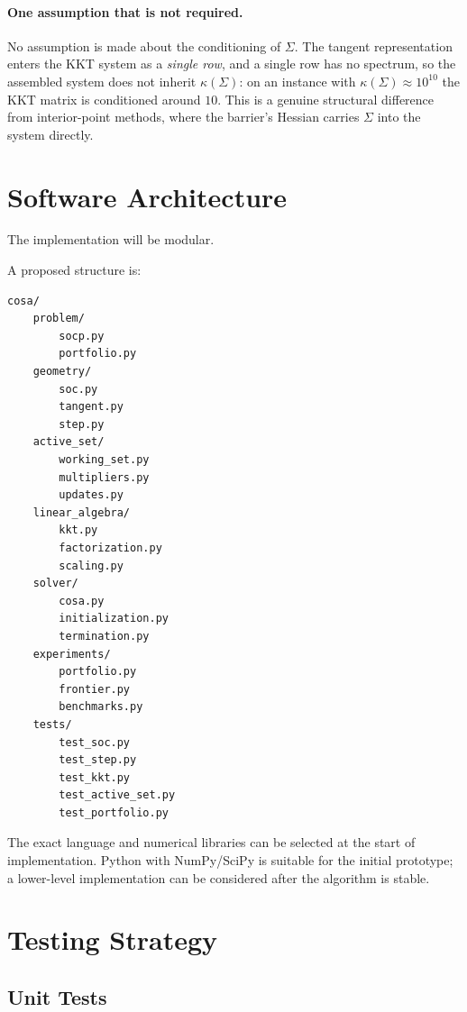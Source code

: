 \documentclass[11pt,a4paper]{article}
\begin{document}
\paragraph{One assumption that is not required.} No assumption is made
about the conditioning of $\Sigma$. The tangent representation enters
the KKT system as a \emph{single row}, and a single row has no
spectrum, so the assembled system does not inherit $\kappa(\Sigma)$: on
an instance with $\kappa(\Sigma)\approx10^{10}$ the KKT matrix is
conditioned around $10$. This is a genuine structural difference from
interior-point methods, where the barrier's Hessian carries $\Sigma$
into the system directly.

\section{Software Architecture}

The implementation will be modular.

A proposed structure is:

\begin{verbatim}
cosa/
    problem/
        socp.py
        portfolio.py
    geometry/
        soc.py
        tangent.py
        step.py
    active_set/
        working_set.py
        multipliers.py
        updates.py
    linear_algebra/
        kkt.py
        factorization.py
        scaling.py
    solver/
        cosa.py
        initialization.py
        termination.py
    experiments/
        portfolio.py
        frontier.py
        benchmarks.py
    tests/
        test_soc.py
        test_step.py
        test_kkt.py
        test_active_set.py
        test_portfolio.py
\end{verbatim}

The exact language and numerical libraries can be selected at the
start of implementation. Python with NumPy/SciPy is suitable for the
initial prototype; a lower-level implementation can be considered
after the algorithm is stable.

\section{Testing Strategy}

\subsection{Unit Tests}
\end{document}
